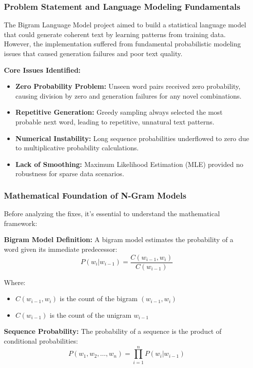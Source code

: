 \documentclass[12pt, a4paper]{article}
\begin{document}
\subsubsection{Problem Statement and Language Modeling Fundamentals}
The Bigram Language Model project aimed to build a statistical language model that could generate coherent text by learning patterns from training data. However, the implementation suffered from fundamental probabilistic modeling issues that caused generation failures and poor text quality.

\textbf{Core Issues Identified:}
\begin{itemize}
    \item \textbf{Zero Probability Problem:} Unseen word pairs received zero probability, causing division by zero and generation failures for any novel combinations.
    \item \textbf{Repetitive Generation:} Greedy sampling always selected the most probable next word, leading to repetitive, unnatural text patterns.
    \item \textbf{Numerical Instability:} Long sequence probabilities underflowed to zero due to multiplicative probability calculations.
    \item \textbf{Lack of Smoothing:} Maximum Likelihood Estimation (MLE) provided no robustness for sparse data scenarios.
\end{itemize}

\subsubsection{Mathematical Foundation of N-Gram Models}

Before analyzing the fixes, it's essential to understand the mathematical framework:

\textbf{Bigram Model Definition:}
A bigram model estimates the probability of a word given its immediate predecessor:
\[
P(w_i | w_{i-1}) = \frac{C(w_{i-1}, w_i)}{C(w_{i-1})}
\]

Where:
\begin{itemize}
    \item $C(w_{i-1}, w_i)$ is the count of the bigram $(w_{i-1}, w_i)$
    \item $C(w_{i-1})$ is the count of the unigram $w_{i-1}$
\end{itemize}

\textbf{Sequence Probability:}
The probability of a sequence is the product of conditional probabilities:
\[
P(w_1, w_2, \dots, w_n) = \prod_{i=1}^n P(w_i | w_{i-1})
\]
\end{document}
